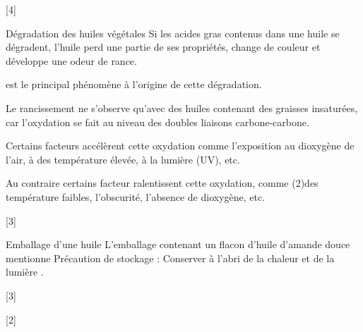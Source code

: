 \pasCorrection{\newpage\vspace*{-30pt}}
[4]


\begin{doc}{Dégradation des huiles végétales}
  Si les acides gras contenus dans une huile se dégradent, l’huile perd une partie de ses propriétés, change de couleur et développe une odeur de rance.
  \begin{importants}  
     est le principal phénomène à l’origine de cette dégradation.
  \end{importants}
  Le rancissement ne s'observe qu'avec des huiles contenant des graisses insaturées, car l'oxydation se fait au niveau des doubles liaisons carbone-carbone.
  \begin{importants}  
    Certains facteurs accélèrent cette oxydation comme l’exposition au dioxygène de l’air, à des température élevée, à la lumière (UV), etc.
  \end{importants}
  \begin{importants}
    Au contraire certains facteur ralentissent cette oxydation, comme \texteTrou(2){des température faibles, l'obscurité, l'absence de dioxygène, etc.}
  \end{importants}
\end{doc}


[3]

\begin{doc}{Emballage d'une huile}
  L'emballage contenant un flacon d'huile d'amande douce mentionne \og Précaution de stockage : Conserver à l’abri de la chaleur et de la lumière \fg.
\end{doc}

[3]

[2]


